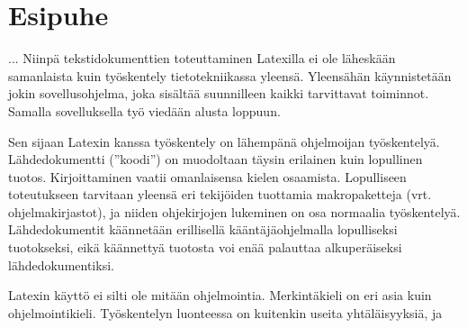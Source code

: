 \documentclass[notitlepage,oneside]{book}
\begin{document}
\pagestyle{empty}




\clearpage
\pagestyle{plain}

\chapter*{Esipuhe}


... Niinpä tekstidokumenttien toteuttaminen Latexilla ei ole läheskään
samanlaista kuin työskentely tietotekniikassa yleensä. Yleensähän
käynnistetään jokin sovellus\-ohjelma, joka sisältää suunnilleen kaikki
tarvittavat toiminnot. Samalla sovelluksella työ viedään alusta loppuun.

Sen sijaan Latexin kanssa työskentely on lähempänä ohjelmoijan
työskentelyä. Lähdedokumentti (''koodi'') on muodoltaan täysin erilainen
kuin lopullinen tuotos. Kirjoittaminen vaatii omanlaisensa kielen
osaamista. Lopulliseen toteutukseen tarvitaan yleensä eri tekijöiden
tuottamia makropaketteja (vrt. ohjelmakirjastot), ja niiden ohjekirjojen
lukeminen on osa normaalia työskentelyä. Lähdedokumentit käännetään
erillisellä kääntäjäohjelmalla lopulliseksi tuotokseksi, eikä käännettyä
tuotosta voi enää palauttaa alkuperäiseksi lähdedokumentiksi.

Latexin käyttö ei silti ole mitään ohjelmointia. Merkintäkieli on eri
asia kuin ohjelmointikieli. Työskentelyn luonteessa on kuitenkin useita
yhtäläisyyksiä, ja 
\end{document}
